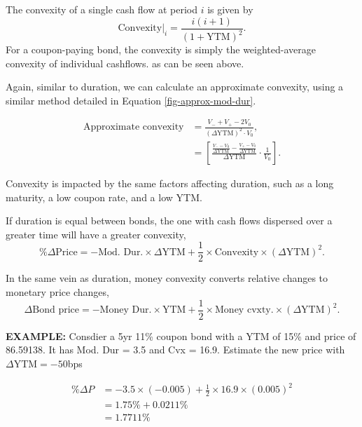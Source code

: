 \documentclass[../notes_compiled.tex]{subfiles}
\begin{document}
\begin{itemize}
The convexity of a single cash flow at period $i$ is given by
\begin{equation}
\text{Convexity}|_{i} = \frac{i(i+1)}{(1+\text{YTM})^{2}}.
\end{equation}
For a coupon-paying bond, the convexity is simply the weighted-average convexity of individual cashflows. as can be seen above.

\item Again, similar to duration, we can calculate an approximate convexity, using a similar method detailed in Equation \ref{fig-approx-mod-dur}.

\begin{align}
\text{Approximate convexity} &= \frac{V_{-}+V_{+}-2V_{0}}{(\Delta\text{YTM})^{2}\cdot V_{0}}, \\
&= \left[ \frac{\frac{V_{-} - V_{0}}{\Delta\text{YTM}} - \frac{V_{+} - V_{0}}{\Delta\text{YTM}}}{\Delta\text{YTM}} \cdot\frac{1}{V_{0}} \right]. \nonumber
\end{align}

\item Convexity is impacted by the same factors affecting duration, such as a long maturity, a low coupon rate, and a low YTM.
\item If duration is equal between bonds, the one with cash flows dispersed over a greater time will have a greater convexity,
\begin{equation}
\%\Delta\text{Price} = -\text{Mod. Dur.} \times \Delta \text{YTM} + \frac{1}{2}\times \text{Convexity} \times (\Delta\text{YTM})^{2}.
\end{equation}

\item In the same vein as duration, money convexity converts relative changes to monetary price changes,
\begin{equation}
\Delta\text{Bond price} = -\text{Money Dur.} \times \text{YTM} + \frac{1}{2}\times \text{Money cvxty.} \times (\Delta\text{YTM})^{2}.
\end{equation}

{\color{RedViolet}
\item[] \textbf{EXAMPLE:} Consdier a 5yr 11\% coupon bond with a YTM of 15\% and price of 86.59138. It has Mod. Dur = 3.5 and Cvx = 16.9. Estimate the new price with $\Delta\text{YTM} = -50$bps
}
{\color{RoyalBlue}
\begin{align*}
\%\Delta P &= -3.5 \times (-0.005) + \frac{1}{2}\times 16.9 \times (0.005)^{2} \\
&=1.75\% + 0.0211\% \\
&=1.7711\%
\end{align*}

}
\end{itemize}
\end{document}
